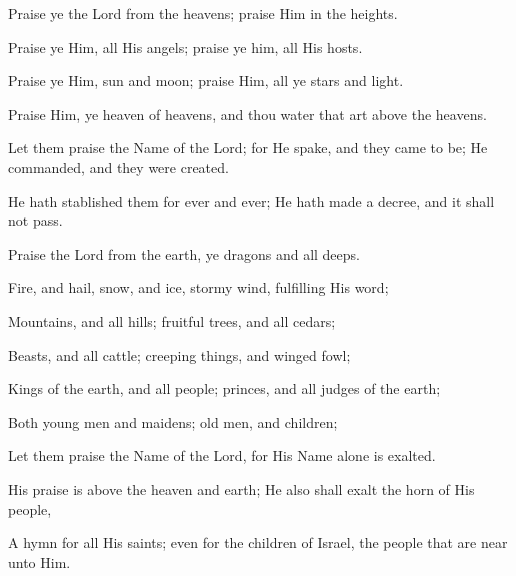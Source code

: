Praise ye the Lord from the heavens; praise Him in the heights.

Praise ye Him, all His angels; praise ye him, all His hosts.

Praise ye Him, sun and moon; praise Him, all ye stars and light.

Praise Him, ye heaven of heavens, and thou water that art above the heavens.

Let them praise the Name of the Lord; for He spake, and they came to be; He commanded, and they were created.

He hath stablished them for ever and ever; He hath made a decree, and it shall not pass.

Praise the Lord from the earth, ye dragons and all deeps.

Fire, and hail, snow, and ice, stormy wind, fulfilling His word;

Mountains, and all hills; fruitful trees, and all cedars;

Beasts, and all cattle; creeping things, and winged fowl;

Kings of the earth, and all people; princes, and all judges of the earth;

Both young men and maidens; old men, and children;

Let them praise the Name of the Lord, for His Name alone is exalted.

His praise is above the heaven and earth; He also shall exalt the horn of His people,

A hymn for all His saints; even for the children of Israel, the people that are near unto Him.
